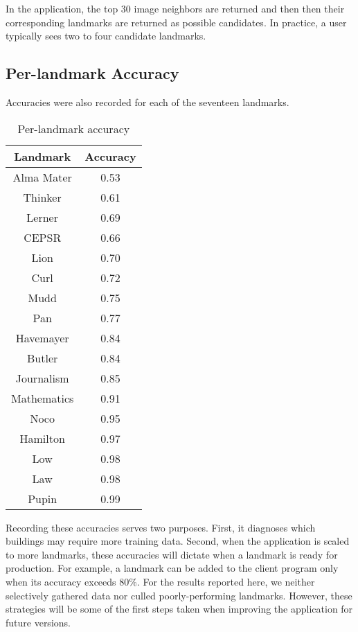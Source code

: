 In the application, the top 30 image neighbors are returned and then then their corresponding landmarks are returned as possible candidates. In practice, a user typically sees two to four candidate landmarks.

\subsection{Per-landmark Accuracy}

Accuracies were also recorded for each of the seventeen landmarks.

\begin{table*}[ht!]
\label{tab:results}
\centering
\begin{tabular}{| c | c |}
\hline
Landmark & Accuracy \\ \hline
Alma Mater	   &	0.53 \\ \hline
Thinker      &    0.61 \\ \hline
Lerner        &    0.69 \\ \hline
CEPSR          &    0.66 \\ \hline
Lion         &    0.70 \\ \hline
Curl           &    0.72 \\ \hline
Mudd           &    0.75 \\ \hline
Pan           &    0.77 \\ \hline
Havemayer      &    0.84 \\ \hline
Butler         &    0.84 \\ \hline
Journalism     &    0.85 \\ \hline
Mathematics    &    0.91 \\ \hline
Noco           &    0.95 \\ \hline
Hamilton       &    0.97 \\ \hline
Low            &    0.98 \\ \hline
Law            &    0.98 \\ \hline
Pupin          &    0.99 \\ \hline
\end{tabular}
\vspace*{10pt}
\caption{Per-landmark accuracy}
\end{table*}

Recording these accuracies serves two purposes. First, it diagnoses which buildings may require more training data. Second, when the application is scaled to more landmarks, these accuracies will dictate when a landmark is ready for production. For example, a landmark can be added to the client program only when its accuracy exceeds 80\%. For the results reported here, we neither selectively gathered data nor culled poorly-performing landmarks. However, these strategies will be some of the first steps taken when improving the application for future versions.  
